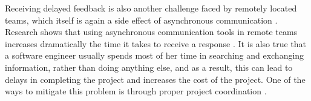 Receiving delayed feedback is also another challenge faced by remotely located teams, which itself is again a side effect of asynchronous communication \citep{conchuir2006exploring}\citep{holmstrom2006agile}. Research shows that using asynchronous communication tools in remote teams increases dramatically the time it takes to receive a response \citep{holmstrom2006global}. It is also true that a software engineer usually spends most of her time in searching and exchanging information, rather than doing anything else, and as a result, this can lead to delays in completing the project and increases the cost of the project. One of the ways to mitigate this problem is through proper project coordination \citep{dumitriu2006issues}.